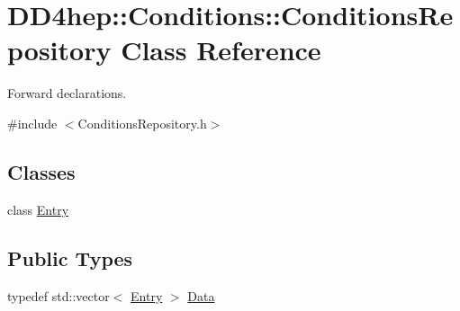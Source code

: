 \hypertarget{class_d_d4hep_1_1_conditions_1_1_conditions_repository}{
\section{DD4hep::Conditions::ConditionsRepository Class Reference}
\label{class_d_d4hep_1_1_conditions_1_1_conditions_repository}
}


Forward declarations.  


{\ttfamily \#include $<$ConditionsRepository.h$>$}\subsection*{Classes}
\begin{DoxyCompactItemize}
\item 
class \hyperlink{class_d_d4hep_1_1_conditions_1_1_conditions_repository_1_1_entry}{Entry}
\end{DoxyCompactItemize}
\subsection*{Public Types}
\begin{DoxyCompactItemize}
\item 
typedef std::vector$<$ \hyperlink{class_d_d4hep_1_1_conditions_1_1_conditions_repository_1_1_entry}{Entry} $>$ \hyperlink{class_d_d4hep_1_1_conditions_1_1_conditions_repository_a2a262d14363e0c6879677397dc595012}{Data}
\end{DoxyCompactItemize}
